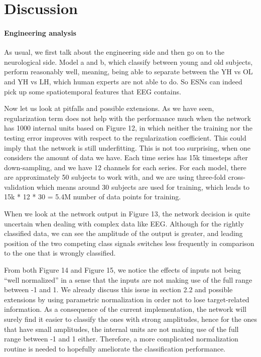 \documentclass[a4paper,11pt,oneside]{article}
\begin{document}
\section{Discussion}
\paragraph{Engineering analysis}
As usual, we first talk about the engineering side and then go on to the neurological side.  Model a and b, which classify between young and old subjects, perform reasonably well, meaning, being able to separate between the YH vs OL and YH vs LH, which human experts are not able to do. So ESNs can indeed pick up some spatiotemporal features that EEG contains.
 
 Now let us look at pitfalls and possible extensions. As we have seen, regularization term does not help with the performance much when the network has 1000 internal units based on Figure 12, in which neither the training nor the testing error improves with respect to the regularization coefficient. This could imply that the network is still underfitting. This is not too surprising, when one considers the amount of data we have. Each time series has 15k timesteps after down-sampling, and we have 12 channels for each series. For each model, there are approximately 50 subjects to work with, and we are using three-fold cross-validation which means around 30 subjects are used for training, which leads to 15k * 12 * 30 = 5.4M number of data points for training.

When we look at the network output in Figure 13, the network decision is quite uncertain when dealing with complex data like EEG. Although for the rightly classified data, we can see the amplitude of the output is greater, and leading position of the two competing class signals switches less frequently in comparison to the one that is wrongly classified.  

From both Figure 14 and Figure 15, we notice the effects of inputs not being ``well normalized'' in a sense that the inputs are not making use of the full range between -1 and 1. We already discuss this issue in section 2.2 and possible extensions by using parametric normalization in order not to lose target-related information. As a consequence of the current implementation, the network will surely find it easier to classify the ones with strong amplitudes, hence for the ones that have small amplitudes, the internal units are not making use of the full range between -1 and 1 either. Therefore, a more complicated normalization routine is needed to hopefully ameliorate the classification performance.
\end{document}
